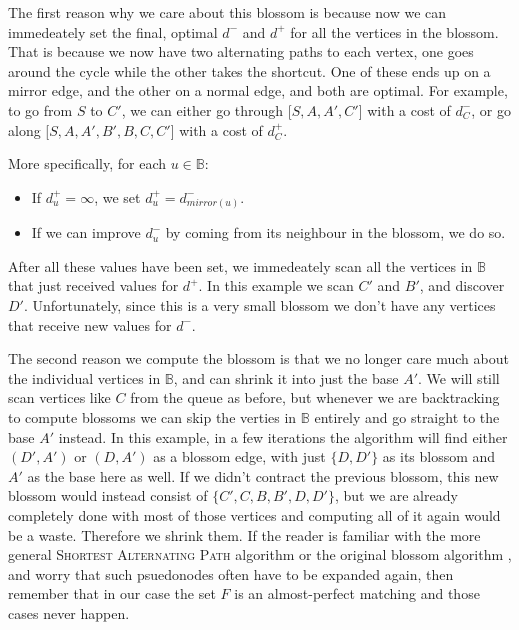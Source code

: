 The first reason why we care about this blossom is because now we can immedeately set the final, optimal $d^-$ and $d^+$ for all the vertices in the blossom. That is because we now have two alternating paths to each vertex, one goes around the cycle while the other takes the shortcut. One of these ends up on a mirror edge, and the other on a normal edge, and both are optimal. For example, to go from $S$ to $C'$, we can either go through [$S,A,A',C'$] with a cost of $d^-_C$, or go along [$S,A,A',B',B,C,C'$] with a cost of $d^+_C$.

More specifically, for each $u \in \mathbb{B}$: \begin{itemize}
    \item If $d^+_u = \infty$, we set $d^+_u = d^-_{mirror(u)}$.
    \item If we can improve $d^-_u$ by coming from its neighbour in the blossom, we do so.
\end{itemize}
After all these values have been set, we immedeately scan all the vertices in $\mathbb{B}$ that just received values for $d^+$. In this example we scan $C'$ and $B'$, and discover $D'$. Unfortunately, since this is a very small blossom we don't have any vertices that receive new values for $d^-$.



The second reason we compute the blossom is that we no longer care much about the individual vertices in $\mathbb{B}$, and can shrink it into just the base $A'$. We will still scan vertices like $C$ from the queue as before, but whenever we are backtracking to compute blossoms we can skip the verties in $\mathbb{B}$ entirely and go straight to the base $A'$ instead. In this example, in a few iterations the algorithm will find either $(D',A')$ or $(D,A')$ as a blossom edge, with just $\{D,D'\}$ as its blossom and $A'$ as the base here as well. If we didn't contract the previous blossom, this new blossom would instead consist of $\{C',C,B,B',D,D'\}$, but we are already completely done with most of those vertices and computing all of it again would be a waste. Therefore we shrink them. If the reader is familiar with the more general \textsc{Shortest Alternating Path} algorithm \cite{shortest_alternating_path} or the original blossom algorithm \cite{blossom}, and worry that such psuedonodes often have to be expanded again, then remember that in our case the set $F$ is an almost-perfect matching and those cases never happen. %

